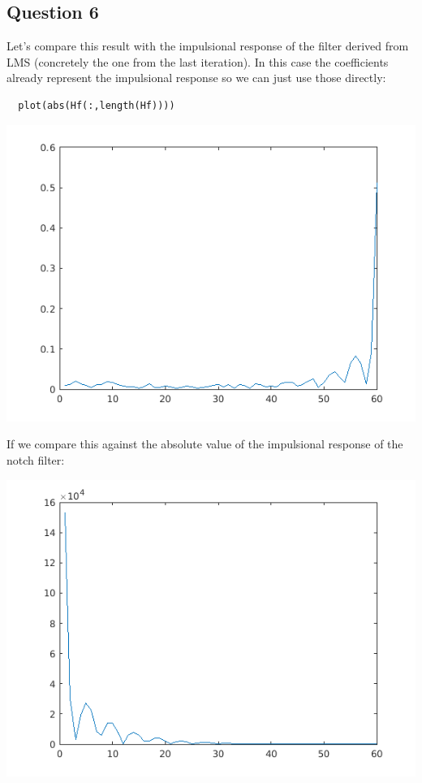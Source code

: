 \documentclass[conference,9pt]{IEEEtran}
\begin{document}
\subsection{Question 6}
Let's compare this result with the impulsional response of the filter derived from LMS (concretely the one from the last iteration). In this case the coefficients already represent the impulsional response so we can just use those directly:
\begin{verbatim}
  plot(abs(Hf(:,length(Hf))))
\end{verbatim}

\includegraphics[scale=0.6]{im-lms.png}

If we compare this against the absolute value of the impulsional response of the notch filter:

\includegraphics[scale=0.6]{im-abs.png}
\end{document}
